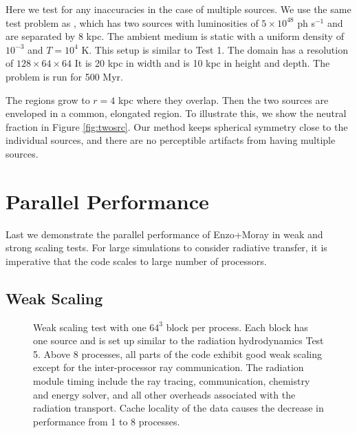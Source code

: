 \documentclass[apj,onecolumn]{emulateapj}
\begin{document}
Here we test for any inaccuracies in the case of multiple sources.  We
use the same test problem as \citet[][\S5.1.2]{Petkova09}, which has
two sources with luminosities of $5 \times 10^{48}$ ph s$^{-1}$ and
are separated by 8 kpc.  The ambient medium is static with a uniform
density of $10^{-3}$ \cubecm and $T = 10^4$ K.  This setup is similar
to Test 1.  The domain has a resolution of $128 \times 64 \times 64$
It is 20 kpc in width and is 10 kpc in height and depth.  The problem
is run for 500 Myr.

The  regions grow to $r = 4$ kpc where they overlap.  Then
the two sources are enveloped in a common, elongated 
region.  To illustrate this, we show the neutral fraction in Figure
\ref{fig:twosrc}.  Our method keeps spherical symmetry close to the
individual sources, and there are no perceptible artifacts from having
multiple sources.

\section{Parallel Performance}

Last we demonstrate the parallel performance of Enzo+Moray in weak and
strong scaling tests.  For large simulations to consider radiative
transfer, it is imperative that the code scales to large number of
processors.

\subsection{Weak Scaling}
\label{sec:weak_sc}

\begin{figure}[t]
  \caption{\label{fig:weak} Weak scaling test with one $64^3$ block
    per process.  Each block has one source and is set up similar to
    the radiation hydrodynamics Test 5.  Above 8 processes, all parts
    of the code exhibit good weak scaling except for the
    inter-processor ray communication.  The radiation module timing
    include the ray tracing, communication, chemistry and energy
    solver, and all other overheads associated with the radiation
    transport.  Cache locality of the data causes the decrease in
    performance from 1 to 8 processes.}
\end{figure}
\end{document}
